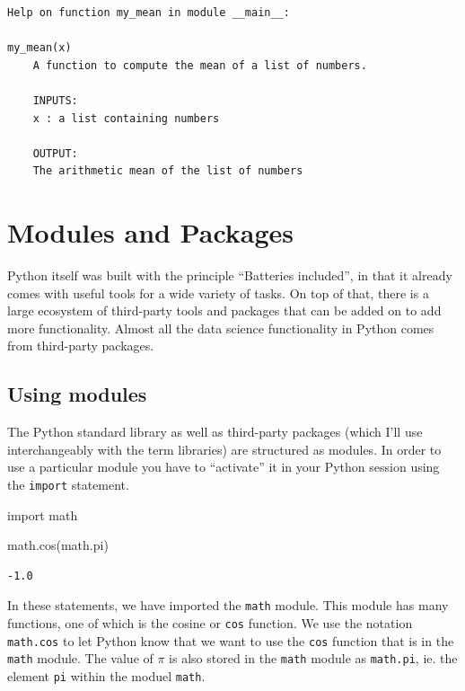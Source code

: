 \documentclass[
  letterpaper,
]{scrbook}
\newenvironment{Shaded}{\begin{snugshade}}{\end{snugshade}}
\newcommand{\ImportTok}[1]{#1}
\newcommand{\NormalTok}[1]{#1}
\begin{document}
\begin{verbatim}
Help on function my_mean in module __main__:

my_mean(x)
    A function to compute the mean of a list of numbers.
    
    INPUTS:
    x : a list containing numbers
    
    OUTPUT:
    The arithmetic mean of the list of numbers
\end{verbatim}

\hypertarget{modules-and-packages}{%
\section{Modules and Packages}\label{modules-and-packages}}

Python itself was built with the principle ``Batteries included'', in that it already comes with useful tools for a wide variety of tasks. On top of that, there is a large ecosystem of third-party tools and packages that can be added on to add more functionality. Almost all the data science functionality in Python comes from third-party packages.

\hypertarget{using-modules}{%
\subsection{Using modules}\label{using-modules}}

The Python standard library as well as third-party packages (which I'll use interchangeably with the term libraries) are structured as modules. In order to use a particular module you have to ``activate'' it in your Python session using the \texttt{import} statement.

\begin{Shaded}
\begin{Highlighting}[]
\ImportTok{import}\NormalTok{ math}

\NormalTok{math.cos(math.pi)}
\end{Highlighting}
\end{Shaded}

\begin{verbatim}
-1.0
\end{verbatim}

In these statements, we have imported the \texttt{math} module. This module has many functions, one of which is the cosine or \texttt{cos} function. We use the notation \texttt{math.cos} to let Python know that we want to use the \texttt{cos} function that is in the \texttt{math} module. The value of \(\pi\) is also stored in the \texttt{math} module as \texttt{math.pi}, ie. the element \texttt{pi} within the moduel \texttt{math}.
\end{document}

